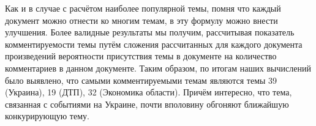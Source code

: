 Как и в случае с расчётом наиболее популярной темы, помня что каждый документ можно отнести ко многим темам,  в эту формулу можно внести улучшения. Более валидные результаты мы получим, рассчитывая показатель комментируемости темы путём сложения рассчитанных для каждого документа произведений вероятности присутствия темы в документе на количество комментариев в данном документе. Таким образом, по итогам наших вычислений было выявлено, что самыми комментируемыми темам являются темы 39 (Украина), 19 (ДТП), 32 (Экономика области). Причём интересно, что тема, связанная с событиями на Украине, почти вполовину обгоняют ближайшую конкурирующую тему.


